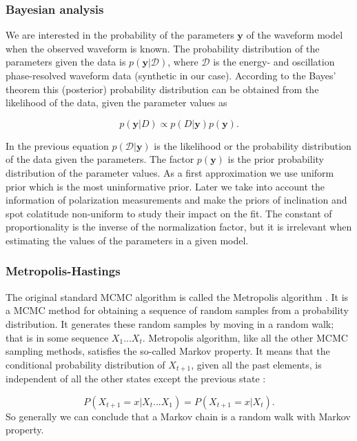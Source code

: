 \documentclass{wihuri}
\def\be{\begin{equation}}
\def\ee{\end{equation}}
\begin{document}
\subsubsection{Bayesian analysis}

We are interested in the probability of the parameters $\textbf{y}$ of the waveform model when the observed waveform is known. The probability distribution of the parameters given the data is $p(\textbf{y}|\mathcal{D})$, where $\mathcal{D}$ is the energy- and oscillation phase-resolved waveform data (synthetic in our case). According to the Bayes' theorem this (posterior) probability distribution can be obtained from the likelihood of the data, given the parameter values as \cite{nattila_bayes}


\be \label{eq:bayes}
p(\textbf{y}|D) \propto p(D|\textbf{y})p(\textbf{y}).
\ee

In the previous equation $p(\mathcal{D}|\textbf{y})$ is the likelihood or the probability distribution of the data given the parameters. The factor $p(\textbf{y})$ is the prior probability distribution of the parameter values. As a first approximation we use uniform prior which is the most uninformative prior. Later we take into account the information of polarization measurements and make the priors of inclination and spot colatitude non-uniform to study their impact on the fit. The constant of proportionality is the inverse of the normalization factor, but it is irrelevant when estimating the values of the parameters in a given model. 


\subsubsection{Metropolis-Hastings}

The original standard MCMC algorithm is called the Metropolis algorithm \cite{metropolis53}\cite{hastings70}. %
It is a MCMC method for obtaining a sequence of random samples from a probability distribution. It generates these random samples by moving in a random walk; that is in some sequence $X_{1}...X_{t}$. Metropolis algorithm, like all the other MCMC sampling methods, satisfies the so-called Markov property. It means that the conditional probability distribution of $X_{t+1}$, given all the past elements, is independent of all the other states except the previous state \cite{kaiser}:

 \be \label{eq:markov_prop}
P(X_{t+1} = x|X_{t}. . . X_{1}) = P(X_{t+1} = x|X_{t}).
\ee
So generally we can conclude that a Markov chain is a random walk with Markov property.
 
\end{document}
